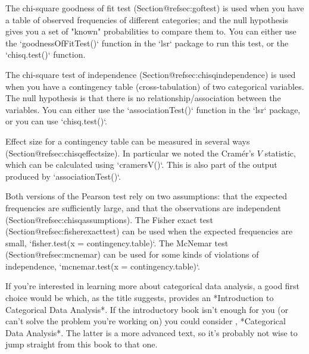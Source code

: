 \item The chi-square goodness of fit test (Section@refsec:goftest) is used when you have a table of observed frequencies of different categories; and the null hypothesis gives you a set of "known" probabilities to compare them to. You can either use the `goodnessOfFitTest()` function in the `lsr` package to run this test, or the `chisq.test()` function. 
\item The chi-square test of independence (Section@refsec:chisqindependence) is used when you have a contingency table (cross-tabulation) of two categorical variables. The null hypothesis is that there is no relationship/association between the variables. You can either use the `associationTest()` function in the `lsr` package, or you can use   `chisq.test()`. 
\item Effect size for a contingency table can be measured in several ways (Section@refsec:chisqeffectsize). In particular we noted the Cram\'er's $V$ statistic, which can be calculated using `cramersV()`. This is also part of the output produced by  `associationTest()`.
\item Both versions of the Pearson test rely on two assumptions: that the expected frequencies are sufficiently large, and that the observations are independent (Section@refsec:chisqassumptions). The Fisher exact test (Section@refsec:fisherexacttest) can be used when the expected frequencies are small, `fisher.test(x = contingency.table)`. The McNemar test (Section@refsec:mcnemar) can be used for some kinds of violations of independence, `mcnemar.test(x = contingency.table)`. 



If you're interested in learning more about categorical data analysis, a good first choice would be  which, as the title suggests, provides an *Introduction to Categorical Data Analysis*. If the introductory book isn't enough for you (or can't solve the problem you're working on) you could consider , *Categorical Data Analysis*. The latter is a more advanced text, so it's probably not wise to jump straight from this book to that one. 

